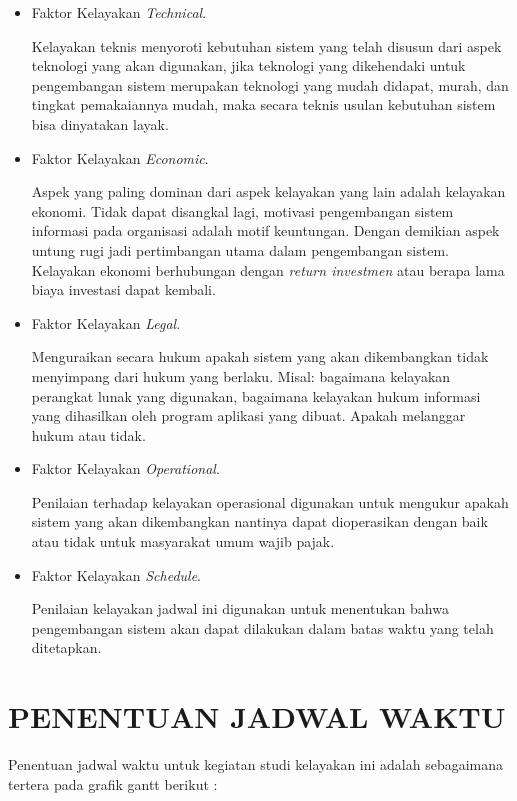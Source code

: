 \documentclass[pdftex,12pt, oneside]{article}
\begin{document}
\begin{itemize}
	\item Faktor Kelayakan \textit{Technical}. 
	
	Kelayakan teknis menyoroti kebutuhan sistem yang telah disusun dari aspek teknologi yang akan digunakan, jika teknologi yang dikehendaki untuk pengembangan sistem merupakan teknologi yang mudah didapat, murah, dan tingkat pemakaiannya mudah, maka secara teknis usulan kebutuhan sistem bisa dinyatakan layak.
	
	\item Faktor Kelayakan \textit{Economic}.
	
	Aspek yang paling dominan dari aspek kelayakan yang lain adalah kelayakan ekonomi. Tidak dapat disangkal lagi, motivasi pengembangan sistem informasi pada organisasi adalah motif keuntungan. Dengan demikian aspek untung rugi jadi pertimbangan utama dalam pengembangan sistem. Kelayakan ekonomi berhubungan dengan \textit{return investmen} atau berapa lama biaya investasi dapat kembali.	
	
	\item Faktor Kelayakan \textit{Legal}.
	
	Menguraikan secara hukum apakah sistem yang akan dikembangkan tidak menyimpang dari hukum yang berlaku. Misal: bagaimana kelayakan perangkat lunak yang digunakan, bagaimana kelayakan hukum informasi yang dihasilkan oleh program aplikasi yang dibuat. Apakah melanggar hukum atau tidak.	
	
	\item Faktor Kelayakan \textit{Operational}.
	
	Penilaian terhadap kelayakan operasional digunakan untuk mengukur apakah sistem yang akan dikembangkan nantinya dapat dioperasikan dengan baik atau tidak untuk masyarakat umum wajib pajak.	
	
	\item Faktor Kelayakan \textit{Schedule}.
	
	Penilaian kelayakan jadwal ini digunakan untuk menentukan bahwa pengembangan sistem akan dapat dilakukan dalam batas waktu yang telah ditetapkan.	
	
\end{itemize}

\section{PENENTUAN JADWAL WAKTU}

Penentuan jadwal waktu untuk kegiatan studi kelayakan ini adalah sebagaimana tertera pada grafik gantt berikut :
\end{document}
